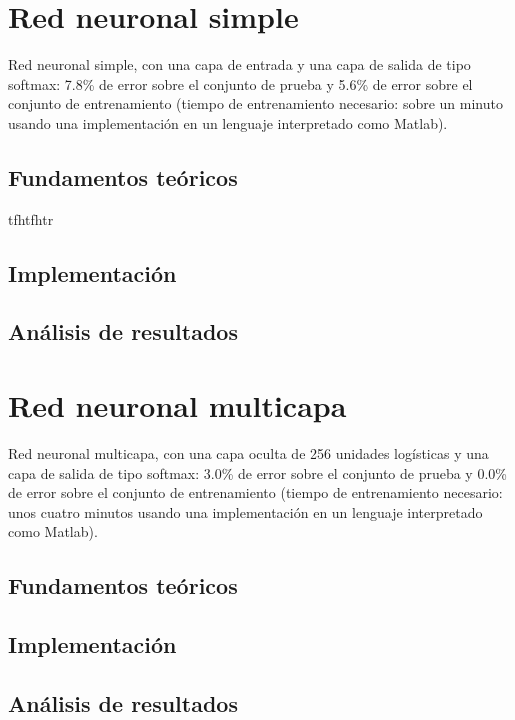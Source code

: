 \section{Red neuronal simple}

Red neuronal simple, con una capa de entrada y una capa de salida de tipo softmax:
7.8\% de error sobre el conjunto de prueba y 5.6\% de error sobre el conjunto de
entrenamiento (tiempo de entrenamiento necesario: sobre un minuto usando una
implementación en un lenguaje interpretado como Matlab).

\subsection{Fundamentos teóricos}

tfhtfhtr

\subsection{Implementación}


\subsection{Análisis de resultados}


\section{Red neuronal multicapa}

Red neuronal multicapa, con una capa oculta de 256 unidades logísticas y una capa
de salida de tipo softmax: 3.0\% de error sobre el conjunto de prueba y 0.0\% de error
sobre el conjunto de entrenamiento (tiempo de entrenamiento necesario: unos cuatro
minutos usando una implementación en un lenguaje interpretado como Matlab).

\subsection{Fundamentos teóricos}

\subsection{Implementación}

\subsection{Análisis de resultados}


